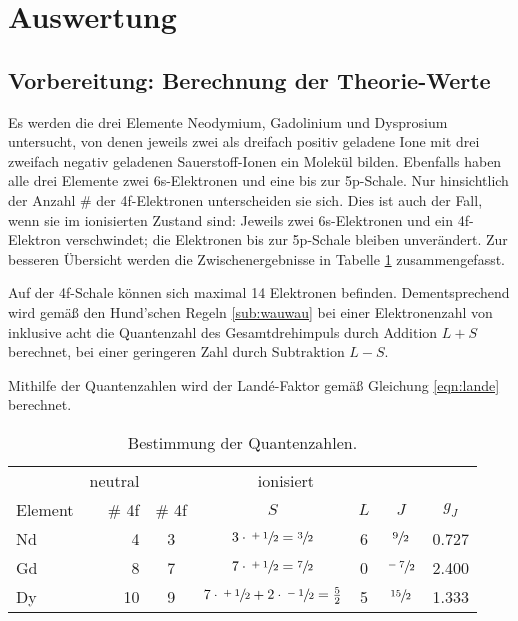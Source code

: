\section{Auswertung}
\label{sec:Auswertung}

\subsection{Vorbereitung: Berechnung der Theorie-Werte}

Es werden die drei Elemente Neodymium, Gadolinium und Dysprosium untersucht, von denen jeweils zwei als dreifach positiv geladene 
Ione mit drei zweifach negativ geladenen Sauerstoff-Ionen ein Molekül bilden. 
Ebenfalls haben alle drei Elemente zwei 6s-Elektronen und eine bis zur 5p-Schale. Nur hinsichtlich der Anzahl \# der 4f-Elektronen unterscheiden sie sich. 
Dies ist auch der Fall, wenn sie im ionisierten Zustand sind: 
Jeweils zwei 6s-Elektronen und ein 4f-Elektron verschwindet; die Elektronen bis zur 5p-Schale bleiben unverändert. 
Zur besseren Übersicht werden die Zwischenergebnisse in Tabelle \ref{tab:Theo1} zusammengefasst. 

Auf der 4f-Schale können sich maximal 14 Elektronen befinden. Dementsprechend wird gemäß den Hund'schen Regeln \ref{sub:wauwau} bei einer Elektronenzahl von inklusive acht 
die Quantenzahl des Gesamtdrehimpuls durch Addition $L+S$ berechnet, bei einer geringeren Zahl durch Subtraktion $L-S$. 

Mithilfe der Quantenzahlen wird der Landé-Faktor gemäß Gleichung \eqref{eqn:lande} berechnet. 

    \begin{table}
        \centering
        \caption{Bestimmung der Quantenzahlen.}
        \label{tab:Theo1}
        \begin{tabular}{l r c c c c c}
            \toprule
             & 
            neutral & 
            \multicolumn{4}{c}{ionisiert} \\
            \cmidrule(lr){2-2} \cmidrule(lr){3-7}
            Element &
            \# 4f & 
            \# 4f &
            $S$ & 
            $L$ & 
            $J$ &
            $g_J$ \\
            \midrule
            Nd &  4 & 3 & $3\cdot\sfrac{+1}{2}=\sfrac{3}{2}$                       & 6 & $\sfrac{9}{2}$  & 0.727 \\
            Gd &  8 & 7 & $7\cdot\sfrac{+1}{2}=\sfrac{7}{2}$                       & 0 & $\sfrac{-7}{2}$ & 2.400 \\
            Dy & 10 & 9 & $7\cdot\sfrac{+1}{2}+2\cdot\sfrac{-1}{2}=\frac{5}{2}$    & 5 & $\sfrac{15}{2}$ & 1.333 \\
            \bottomrule
        \end{tabular}
    \end{table}

